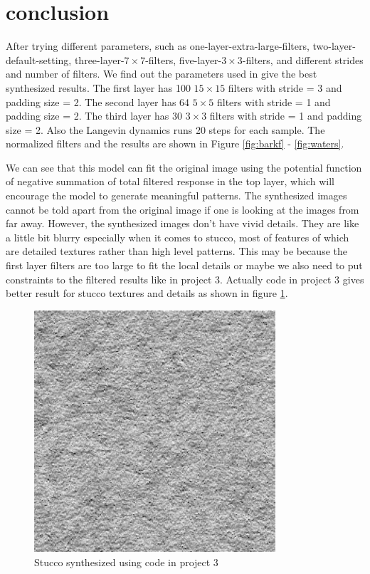 \documentclass[11pt, oneside]{article}   	%
\begin{document}
\section{conclusion}
After trying different parameters, such as one-layer-extra-large-filters, two-layer-default-setting, three-layer-$7\times7$-filters, five-layer-$3\times3$-filters, and different strides and number of filters. We find out the parameters used in \cite{xie2016theory} give the best synthesized results. The first layer has 100 $15\times15$ filters with stride = 3 and padding size = 2. The second layer has 64 $5\times5$ filters with stride = 1 and padding size = 2. The third layer has 30 $3\times3$ filters with stride = 1 and padding size = 2. Also the Langevin dynamics runs 20 steps for each sample. The normalized filters and the results are shown in Figure \ref{fig:barkf} - \ref{fig:waters}.

We can see that this model can fit the original image using the potential function of negative summation of total filtered response in the top layer, which will encourage the model to generate meaningful patterns. The synthesized images cannot be told apart from the original image if one is looking at the images from far away. However, the synthesized images don't have vivid details. They are like a little bit blurry especially when it comes to stucco, most of features of which are detailed textures rather than high level patterns. This may be because the first layer filters are too large to fit the local details or maybe we also need to put constraints to the filtered results like in project 3. Actually code in project 3 gives better result for stucco textures and details as shown in figure \ref{fig:3}.

\begin{figure}[H]
	\centering
	\includegraphics[width=0.8\textwidth]{stucco4}
	\caption{Stucco synthesized using code in project 3}
	\label {fig:3}
\end{figure}



\end{document}

